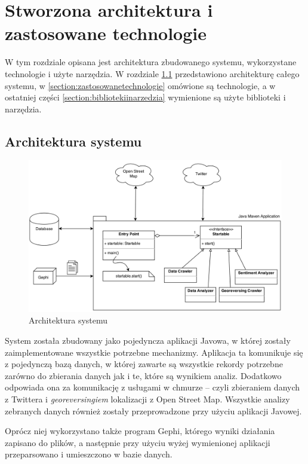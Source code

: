 \chapter{Stworzona architektura i zastosowane technologie}
\label{chapter:architektura}
W tym rozdziale opisana jest architektura zbudowanego systemu, wykorzystane
technologie i użyte narzędzia.
W rozdziale \ref{section:architekturasystemu} przedstawiono architekturę całego
systemu, w \ref{section:zastosowanetechnologie} omówione są technologie, a w
ostatniej części \ref{section:bibliotekiinarzedzia} wymienione są użyte biblioteki i
narzędzia.
\section{Architektura systemu}
\label{section:architekturasystemu}

\begin{figure}[ht!] \centering
\includegraphics[width=140mm]{img/architektura.png}
\caption{Architektura systemu}
\label{image:architektura-systemu}
\end{figure}
System została zbudowany jako pojedyncza aplikacji Javowa, w której zostały
zaimplementowane wszystkie potrzebne mechanizmy.
Aplikacja ta komunikuje się z pojedynczą bazą danych, w której zawarte są
wszystkie rekordy potrzebne zarówno do zbierania danych jak i te, które są
wynikiem analiz. Dodatkowo odpowiada ona za komunikację z usługami w chmurze --
czyli zbieraniem danych z Twittera i \textit{georeversingiem} lokalizacji
 z Open Street Map. Wszystkie analizy zebranych
danych również zostały przeprowadzone przy użyciu aplikacji Javowej.

Oprócz niej wykorzystano także program Gephi, którego wyniki działania zapisano
do plików, a następnie przy użyciu wyżej wymienionej aplikacji przeparsowano i
umieszczono w bazie danych.

